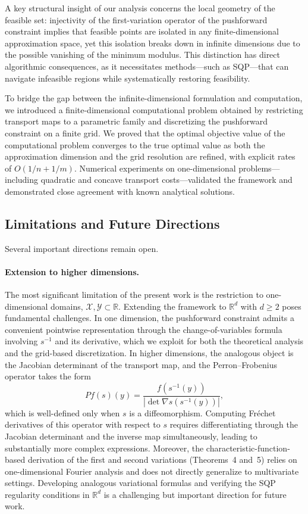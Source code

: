 \documentclass[12pt,leqno]{amsart}
\newcounter{experiment}
\begin{document}
A key structural insight of our analysis concerns the local geometry of the feasible set: injectivity of the first-variation operator of the pushforward constraint implies that feasible points are isolated in any finite-dimensional approximation space, yet this isolation breaks down in infinite dimensions due to the possible vanishing of the minimum modulus. This distinction has direct algorithmic consequences, as it necessitates methods---such as SQP---that can navigate infeasible regions while systematically restoring feasibility.

To bridge the gap between the infinite-dimensional formulation and computation, we introduced a finite-dimensional computational problem obtained by restricting transport maps to a parametric family and discretizing the pushforward constraint on a finite grid. We proved that the optimal objective value of the computational problem converges to the true optimal value as both the approximation dimension and the grid resolution are refined, with explicit rates of $O(1/n + 1/m)$. Numerical experiments on one-dimensional problems---including quadratic and concave transport costs---validated the framework and demonstrated close agreement with known analytical solutions.



\subsection{Limitations and Future Directions}

Several important directions remain open.

\paragraph{\bf Extension to higher dimensions.}
The most significant limitation of the present work is the restriction to one-dimensional domains, $\mathcal{X}, \mathcal{Y} \subset \mathbb{R}$. Extending the framework to $\mathbb{R}^d$ with $d \geq 2$ poses fundamental challenges. In one dimension, the pushforward constraint admits a convenient pointwise representation through the change-of-variables formula involving $s^{-1}$ and its derivative, which we exploit for both the theoretical analysis and the grid-based discretization. In higher dimensions, the analogous object is the Jacobian determinant of the transport map, and the Perron--Frobenius operator takes the form
\[
Pf(s)(y) = \frac{f(s^{-1}(y))}{|\det \nabla s(s^{-1}(y))|},
\]
which is well-defined only when $s$ is a diffeomorphism. Computing Fr\'echet derivatives of this operator with respect to $s$ requires differentiating through the Jacobian determinant and the inverse map simultaneously, leading to substantially more complex expressions. Moreover, the characteristic-function-based derivation of the first and second variations (Theorems~4 and~5) relies on one-dimensional Fourier analysis and does not directly generalize to multivariate settings. Developing analogous variational formulas and verifying the SQP regularity conditions in $\mathbb{R}^d$ is a challenging but important direction for future work.
\end{document}
